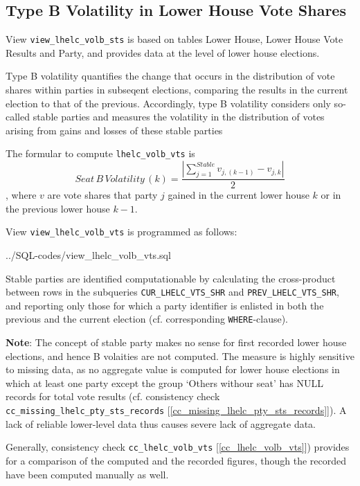 \subsection{Type B Volatility in Lower House Vote Shares}\label{view_lhelc_volb_vts}
View \texttt{\footnotesize view\_lhelc\_volb\_sts} is based on tables Lower House, Lower House Vote Results and Party, and provides data at the level of lower house elections.

Type B volatility quantifies the change that occurs in the distribution of vote shares within parties in subseqent elections, comparing the results in the current election to that of the previous. 
Accordingly, type B volatility considers only so-called stable parties and measures the  volatility in the distribution of votes arising from gains and losses of these stable parties	

The formular to compute \texttt{\footnotesize lhelc\_volb\_vts} is
\begin{equation}
Seat\,B\,Volatility\,(k) = \frac{ | \sum\limits_{j=1}^{Stable} v_{j,(k-1)} - v_{j,k}| }{2}
\end{equation}, where $v$ are vote shares that party $j$ gained in the current lower house $k$ or in the previous lower house $k-1$.

View \texttt{\footnotesize view\_lhelc\_volb\_vts} is programmed as follows:

%
{../SQL-codes/view_lhelc_volb_vts.sql}

Stable parties are identified computationable by calculating the cross-product between rows in the subqueries 
\texttt{\footnotesize CUR\_LHELC\_VTS\_SHR} and \texttt{\footnotesize PREV\_LHELC\_VTS\_SHR}, and reporting only those for which a party identifier is enlisted in both the previous and the current election (cf. corresponding \texttt{\footnotesize WHERE}-clause). 

{\bf Note}: The concept of stable party makes no sense for first recorded lower house elections, and hence B volaities are not computed. 
The measure is highly sensitive to missing data, as no aggregate value is computed for lower house  elections in which at least one party except the group `Others withour seat' has NULL records for total vote results (cf. consistency check \texttt{\footnotesize cc\_missing\_lhelc\_pty\_sts\_records} [\ref{cc_missing_lhelc_pty_sts_records}]). A lack of reliable lower-level data thus causes severe lack of aggregate data. 

Generally, consistency check \texttt{\footnotesize cc\_lhelc\_volb\_vts} [\ref{cc_lhelc_volb_vts}]) provides for a comparison of the computed and the recorded figures, though the recorded have been computed manually as well.

